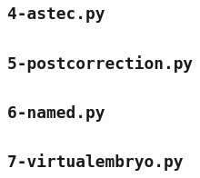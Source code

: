 \subsection{\texttt{4-astec.py}}

\subsection{\texttt{5-postcorrection.py}}

\subsection{\texttt{6-named.py}}

\subsection{\texttt{7-virtualembryo.py}}




